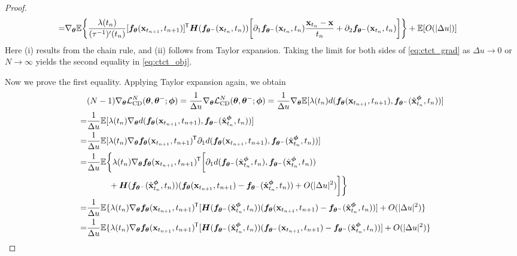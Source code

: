 \begin{appendices}
\begin{proof}
\begin{align}
        =&\nabla_{\bm{\theta}} \mathbb{E}\bigg\{\frac{\lambda(t_n)}{(\tau^{-1})'(t_n)}[{\bm{f}}_{\bm{\theta}}({\mathbf{x}}_{t_{n+1}}, t_{n+1})]^{\mkern-1.5mu\mathsf{T}} {\bm{H}}({\bm{f}}_{{\bm{\theta}}^{-}}({\mathbf{x}}_{t_n}, t_n))\bigg[\partial_1 {\bm{f}}_{{\bm{\theta}}^{-}}({\mathbf{x}}_{t_n}, t_n)\frac{{\mathbf{x}}_{t_n} - {\mathbf{x}}}{t_n} + \partial_2 {\bm{f}}_{{\bm{\theta}}^{-}}({\mathbf{x}}_{t_n}, t_n)\bigg]\bigg\} + \mathbb{E}[O(|\Delta u|)]\label{eq:ctct_grad}
    \end{align}
    Here (i) results from the chain rule, and (ii) follows from Taylor expansion. Taking the limit for both sides of \cref{eq:ctct_grad} as $\Delta u \to 0$ or $N\to\infty$ yields the second equality in \cref{eq:ctct_obj}.

    Now we prove the first equality. Applying Taylor expansion again, we obtain
    \begin{align*}
        &(N-1)\nabla_\vtheta \mcal{L}_\text{CD}^N(\vtheta, \vtheta^{-}; \vphi) = \frac{1}{\Delta u}\nabla_\vtheta \mcal{L}_\text{CD}^N(\vtheta, \vtheta^{-}; \vphi) = \frac{1}{\Delta u}\nabla_\vtheta \mbb{E}[\lambda(t_n)d(\vf_\vtheta(\rvx_{t_{n+1}}, t_{n+1}), \vf_{\vtheta^{-}}(\hat{\rvx}_{t_n}^\vphi, t_n))]\\
        =& \frac{1}{\Delta u}\mbb{E}[\lambda(t_n)\nabla_\vtheta d(\vf_\vtheta(\rvx_{t_{n+1}}, t_{n+1}), \vf_{\vtheta^{-}}(\hat{\rvx}_{t_n}^\vphi, t_n))]\\
        =& \frac{1}{\Delta u}\mbb{E}[\lambda(t_n) \nabla_\vtheta \vf_\vtheta(\rvx_{t_{n+1}}, t_{n+1})\tran \partial_1 d(\vf_\vtheta(\rvx_{t_{n+1}}, t_{n+1}), \vf_{\vtheta^{-}}(\hat{\rvx}_{t_n}^\vphi, t_n))]\\
        =& \frac{1}{\Delta u}\begin{multlined}[t][0.9\displaywidth]
            \mbb{E}\bigg\{\lambda(t_n) \nabla_\vtheta \vf_\vtheta(\rvx_{t_{n+1}}, t_{n+1})\tran \bigg[\partial_1 d(\vf_{\vtheta^{-}}(\hat{\rvx}_{t_n}^\vphi, t_n), \vf_{\vtheta^{-}}(\hat{\rvx}_{t_n}^\vphi, t_n)) \\+ \mH(\vf_{\vtheta^{-}}(\hat{\rvx}_{t_n}^\vphi, t_n)) (\vf_\vtheta(\rvx_{t_{n+1}}, t_{n+1}) - \vf_{\vtheta^{-}}(\hat{\rvx}_{t_n}^\vphi, t_n)) + O(|\Delta u|^2)\bigg]\bigg\}
        \end{multlined}\\
        =& \frac{1}{\Delta u}\mbb{E}\{\lambda(t_n) \nabla_\vtheta \vf_\vtheta(\rvx_{t_{n+1}}, t_{n+1})\tran [\mH(\vf_{\vtheta^{-}}(\hat{\rvx}_{t_n}^\vphi, t_n)) (\vf_\vtheta(\rvx_{t_{n+1}}, t_{n+1}) - \vf_{\vtheta^{-}}(\hat{\rvx}_{t_n}^\vphi, t_n))] + O(|\Delta u|^2)\}
        \\
        =& \frac{1}{\Delta u}\mbb{E}\{\lambda(t_n) \nabla_\vtheta \vf_\vtheta(\rvx_{t_{n+1}}, t_{n+1})\tran [\mH(\vf_{\vtheta^{-}}(\hat{\rvx}_{t_n}^\vphi, t_n)) (\vf_{\vtheta^{-}}(\rvx_{t_{n+1}}, t_{n+1}) - \vf_{\vtheta^{-}}(\hat{\rvx}_{t_n}^\vphi, t_n))] + O(|\Delta u|^2)\}\\

\end{align*}
\end{proof}
\end{appendices}
